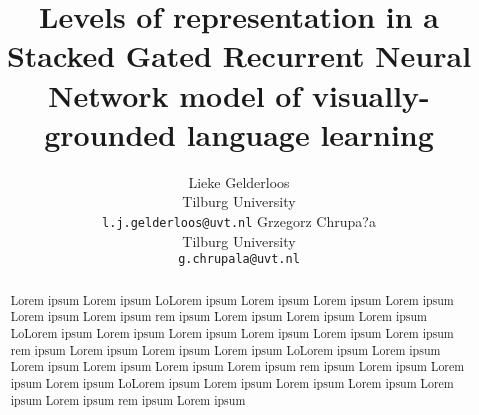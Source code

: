 \documentclass[11pt,letterpaper]{article}
\title{Levels of representation in a Stacked Gated Recurrent Neural
  Network model of visually-grounded language learning}
\author{Lieke Gelderloos \\
  Tilburg University \\
  {\tt l.j.gelderloos@uvt.nl} \And
  Grzegorz Chrupa?a \\
  Tilburg University \\
  {\tt g.chrupala@uvt.nl} }
\date{}
\begin{document}
\maketitle
\begin{abstract}
Lorem ipsum Lorem ipsum LoLorem ipsum Lorem ipsum Lorem ipsum Lorem
ipsum Lorem ipsum Lorem ipsum rem ipsum Lorem ipsum 
Lorem ipsum Lorem ipsum LoLorem ipsum Lorem ipsum Lorem ipsum Lorem
ipsum Lorem ipsum Lorem ipsum rem ipsum Lorem ipsum 
Lorem ipsum Lorem ipsum LoLorem ipsum Lorem ipsum Lorem ipsum Lorem
ipsum Lorem ipsum Lorem ipsum rem ipsum Lorem ipsum 
Lorem ipsum Lorem ipsum LoLorem ipsum Lorem ipsum Lorem ipsum Lorem
ipsum Lorem ipsum Lorem ipsum rem ipsum Lorem ipsum 

\end{abstract}











\end{document}
